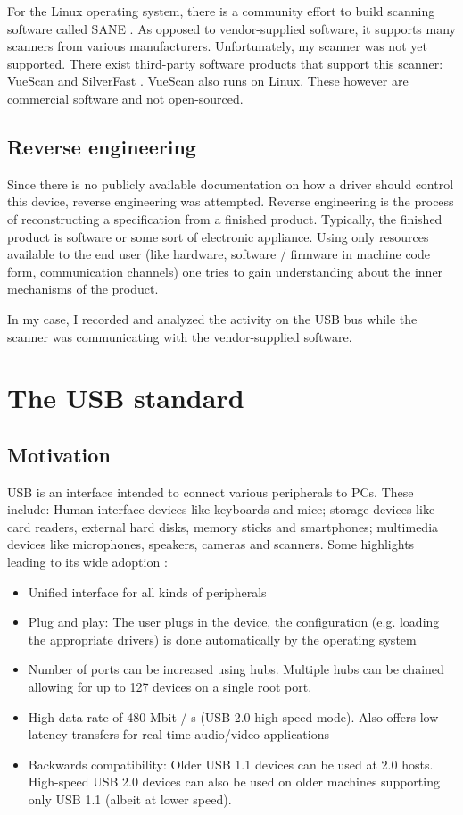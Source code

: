\documentclass{article}
\begin{document}
For the Linux operating system, there is a community effort to build scanning software
called SANE \cite{saneproject}. As opposed to vendor-supplied software, it supports many scanners
from various manufacturers. Unfortunately, my scanner was not yet supported.
There exist third-party software products that support this scanner: VueScan \cite{vuescan}
and SilverFast \cite{silverfast}. VueScan also runs on Linux. These however are commercial software
and not open-sourced.

\subsection{Reverse engineering}

Since there is no publicly available documentation on how a driver should control this
device, reverse engineering was attempted.
Reverse engineering is the process of reconstructing a specification from a finished
product. Typically, the finished product is software or some sort of electronic
appliance.
Using only resources available to the end user (like hardware,
software / firmware in machine code form, communication channels)
one tries to gain understanding about the inner mechanisms of the product.

In my case, I recorded and analyzed the activity on the USB bus while the scanner
was communicating with the vendor-supplied software.

\section{The USB standard}

\subsection{Motivation}

USB is an interface intended to connect various peripherals to PCs. These include:
Human interface devices like keyboards and mice; storage devices like card readers,
external hard disks, memory sticks and smartphones; multimedia devices like microphones, speakers,
cameras and scanners. Some highlights leading to its wide adoption \cite[p. 11]{usbstd}:

\begin{itemize}
  \item Unified interface for all kinds of peripherals
  \item Plug and play: The user plugs in the device, the configuration (e.g. loading the appropriate drivers)
  is done automatically by the operating system
  \item Number of ports can be increased using hubs. Multiple hubs can be chained
        allowing for up to 127 devices on a single root port.
  \item High data rate of 480 Mbit / s (USB 2.0 high-speed mode). Also offers low-latency
        transfers for real-time audio/video applications
  \item Backwards compatibility: Older USB 1.1 devices can be used at 2.0 hosts.
        High-speed USB 2.0 devices can also be used on older
        machines supporting only USB 1.1 (albeit at lower speed).
\end{itemize}
\end{document}
